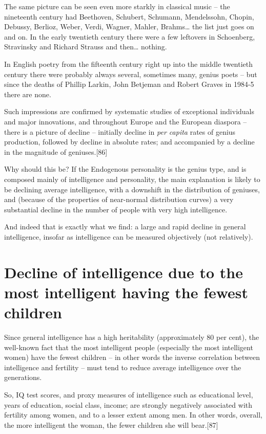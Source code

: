 \documentclass[
]{book}
\begin{document}
The same picture can be seen even more starkly in classical music -- the nineteenth century had Beethoven, Schubert, Schumann, Mendelssohn, Chopin, Debussy, Berlioz, Weber, Verdi, Wagner, Mahler, Brahms\ldots{} the list just goes on and on. In the early twentieth century there were a few leftovers in Schoenberg, Stravinsky and Richard Strauss and then\ldots{} nothing.

In English poetry from the fifteenth century right up into the middle twentieth century there were probably always several, sometimes many, genius poets -- but since the deaths of Phillip Larkin, John Betjeman and Robert Graves in 1984-5 there are none.

Such impressions are confirmed by systematic studies of exceptional individuals and major innovations, and throughout Europe and the European diaspora -- there is a picture of decline -- initially decline in \emph{per capita} rates of genius production, followed by decline in absolute rates; and accompanied by a decline in the magnitude of geniuses.{[}86{]}

Why should this be? If the Endogenous personality is the genius type, and is composed mainly of intelligence and personality, the main explanation is likely to be declining average intelligence, with a downshift in the distribution of geniuses, and (because of the properties of near-normal distribution curves) a very substantial decline in the number of people with very high intelligence.

And indeed that is exactly what we find: a large and rapid decline in general intelligence, insofar as intelligence can be measured objectively (not relatively).

\hypertarget{decline-of-intelligence-due-to-the-most-intelligent-having-the-fewest-children}{%
\section{Decline of intelligence due to the most intelligent having the fewest children}\label{decline-of-intelligence-due-to-the-most-intelligent-having-the-fewest-children}}

Since general intelligence has a high heritability (approximately 80 per cent), the well-known fact that the most intelligent people (especially the most intelligent women) have the fewest children -- in other words the inverse correlation between intelligence and fertility -- must tend to reduce average intelligence over the generations.

So, IQ test scores, and proxy measures of intelligence such as educational level, years of education, social class, income; are strongly negatively associated with fertility among women, and to a lesser extent among men. In other words, overall, the more intelligent the woman, the fewer children she will bear.{[}87{]}
\end{document}
